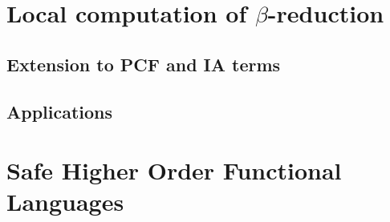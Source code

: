 \chapter{Local computation of $\beta$-reduction}

          


    \section{Extension to PCF and IA terms}
    \section{Applications}



\chapter{Safe Higher Order Functional Languages}

    

